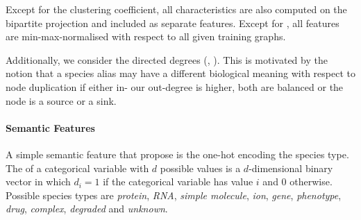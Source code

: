 \documentclass[
	fontsize=10pt, %
	twoside=false, %
	secnumdepth=1, %
  toc=indentunnumbered %
]{kaobook}
\begin{document}
Except for the clustering coefficient, all characteristics are also
computed on the bipartite projection and included as separate features.
Except for , all features are min-max-normalised
with respect to all given training graphs.


Additionally, we consider the directed degrees (,
). This is motivated by the notion that a species alias may
have a different biological meaning with respect to node duplication if either in- our
out-degree is higher, both are balanced or the node is a source or a sink.




\paragraph{Semantic Features}

A simple semantic feature that \citeauthor{nielsen_MachineLearningSupport_2019}
propose is the one-hot encoding the species type.
The  of a categorical variable with $d$ possible values is
a $d$-dimensional binary vector in which $d_i = 1$ if the categorical variable has
value $i$ and $0$ otherwise.
Possible species types are
\textit{protein}, \textit{RNA}, \textit{simple molecule}, \textit{ion},
\textit{gene}, \textit{phenotype}, \textit{drug}, \textit{complex},
\textit{degraded} and \textit{unknown}. 
\end{document}
